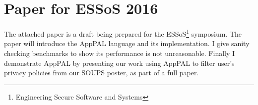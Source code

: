 \documentclass[a4paper]{scrartcl}
\begin{document}
\section{Paper for ESSoS 2016}

The attached paper is a draft being prepared for the ESSoS\footnote{Engineering Secure Software and Systems} symposium.
The paper will introduce the AppPAL language and its implementation.
I give sanity checking benchmarks to show its performance is not unreasonable.
Finally I demonstrate AppPAL by presenting our work using AppPAL to filter user's privacy policies from our SOUPS poster, as part of a full paper.


\end{document}
